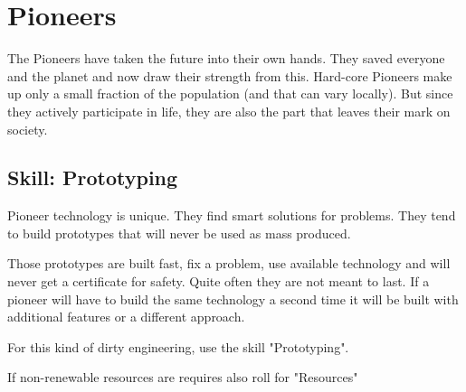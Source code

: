 \section{Pioneers}

The Pioneers have taken the future into their own hands. They saved everyone and the planet and now draw their strength from this.
Hard-core Pioneers make up only a small fraction of the population (and that can vary locally). But since they actively participate in life, they are also the part that leaves their mark on society.

\subsection{Skill: Prototyping}

Pioneer technology is unique. They find smart solutions for problems. They tend to build prototypes that will never be used as mass produced.

Those prototypes are built fast, fix a problem, use available technology and will never get a certificate for safety.
Quite often they are not meant to last.
If a pioneer will have to build the same technology a second time it will be built with additional features or a different approach.

For this kind of dirty engineering, use the skill "Prototyping".

If non-renewable resources are requires also roll for "Resources"